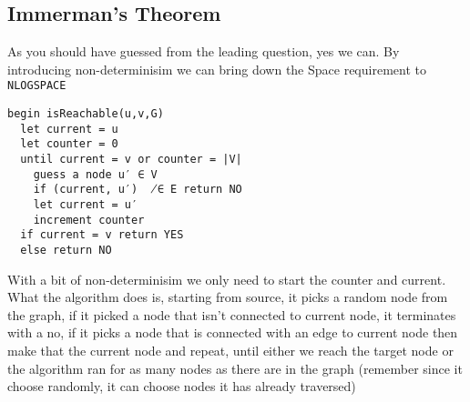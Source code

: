 \subsection{Immerman’s Theorem}
As you should have guessed from the leading question, yes we can. 
By introducing non-determinisim we can bring down the Space requirement to \texttt{NLOGSPACE}
\begin{verbatim}
begin isReachable(u,v,G)
  let current = u
  let counter = 0
  until current = v or counter = |V|
    guess a node u′ ∈ V
    if (current, u′)  ̸∈ E return NO 
    let current = u′
    increment counter
  if current = v return YES 
  else return NO
\end{verbatim}
With a bit of non-determinisim we only need to start the counter and current.
What the algorithm does is, starting from source, it picks a random node from the graph, 
if it picked a node that isn't connected to current node,
it terminates with a no, if it picks a node that is connected with an edge to current node then make that the current node and repeat, 
until either we reach the target node or the algorithm ran for as many nodes as there are in the graph (remember since it choose randomly, it can choose nodes it has already traversed)
